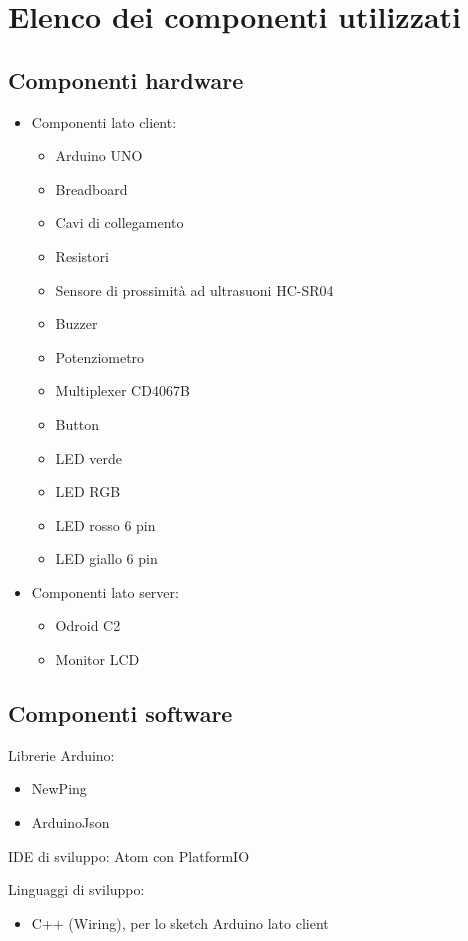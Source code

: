 \chapter{Elenco dei componenti utilizzati}

\section{Componenti hardware}
\begin{itemize}
	\item Componenti lato client:
	\begin{itemize}
		\item Arduino UNO
		\item Breadboard
		\item Cavi di collegamento
		\item Resistori
		\item Sensore di prossimità ad ultrasuoni HC-SR04
		\item Buzzer
		\item Potenziometro
		\item Multiplexer CD4067B
		\item Button
		\item LED verde
		\item LED RGB
		\item LED rosso 6 pin
		\item LED giallo 6 pin
	\end{itemize}
\end{itemize}

\begin{itemize}
	\item Componenti lato server:
	\begin{itemize}
		\item Odroid C2
		\item Monitor LCD
	\end{itemize}
\end{itemize}

\section{Componenti software}
Librerie Arduino:
\begin{itemize}
	\item NewPing
	\item ArduinoJson
\end{itemize}

IDE di sviluppo: Atom con PlatformIO

Linguaggi di sviluppo:
\begin{itemize}
	\item C++ (Wiring), per lo sketch Arduino lato client 
\end{itemize}